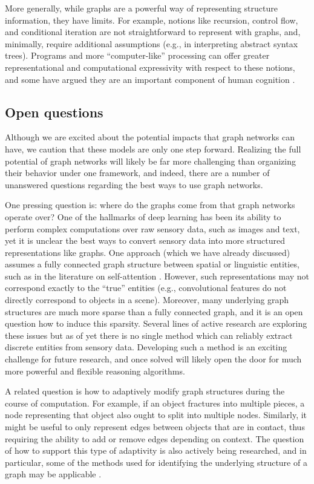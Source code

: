 More generally, while graphs are a powerful way of representing structure information, they have limits.
For example, notions like recursion, control flow, and conditional iteration are not straightforward to represent with graphs, and, minimally, require additional assumptions (e.g., in interpreting abstract syntax trees). Programs and more ``computer-like'' processing can offer greater representational and computational expressivity with respect to these notions, and some have argued they are an important component of human cognition \citep{tenenbaum2011grow,lake2015human,goodman2015concepts}.

\subsection{Open questions}

Although we are excited about the potential impacts that graph networks can have, we caution that these models are only one step forward.
Realizing the full potential of graph networks will likely be far more challenging than organizing their behavior under one framework, and indeed, there are a number of unanswered questions regarding the best ways to use graph networks.

One pressing question is: where do the graphs come from that graph networks operate over?
One of the hallmarks of deep learning has been its ability to perform complex computations over raw sensory data, such as images and text, yet it is unclear the best ways to convert sensory data into more structured representations like graphs.
One approach (which we have already discussed) assumes a fully connected graph structure between spatial or linguistic entities, such as in the literature on self-attention \citep{vaswani2017attention,wang2017non}.
However, such representations may not correspond exactly to the ``true'' entities (e.g., convolutional features do not directly correspond to objects in a scene).
Moreover, many underlying graph structures are much more sparse than a fully connected graph, and it is an open question how to induce this sparsity.
Several lines of active research are exploring these issues \citep{watters2017visual,van2018relational,li2018deep,kipf2018neural} but as of yet there is no single method which can reliably extract discrete entities from sensory data.
Developing such a method is an exciting challenge for future research, and once solved will likely open the door for much more powerful and flexible reasoning algorithms.

A related question is how to adaptively modify graph structures during the course of computation.
For example, if an object fractures into multiple pieces, a node representing that object also ought to split into multiple nodes.
Similarly, it might be useful to only represent edges between objects that are in contact, thus requiring the ability to add or remove edges depending on context.
The question of how to support this type of adaptivity is also actively being researched, and in particular, some of the methods used for identifying the underlying structure of a graph may be applicable \citep[e.g.][]{li2018deep,kipf2018neural}.

